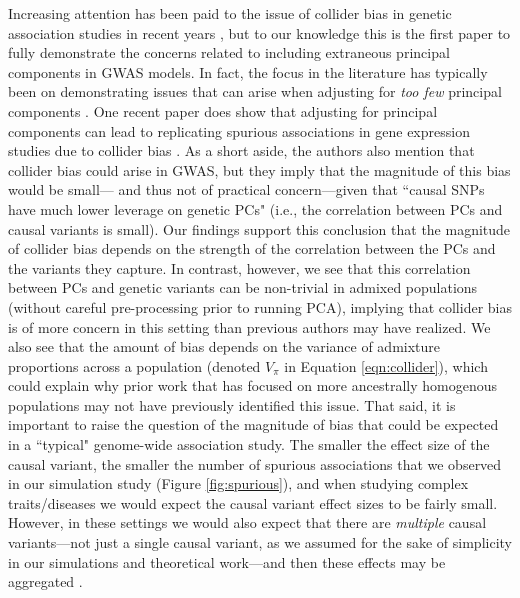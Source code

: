 \documentclass[12pt]{article}
\begin{document}
Increasing attention has been paid to the issue of collider bias in genetic association studies in recent years \citep{aschard2015, day2016, cai2022, hemani2022}, but to our knowledge this is the first paper to fully demonstrate the concerns related to including extraneous principal components in GWAS models.
In fact, the focus in the literature has typically been on demonstrating issues that can arise when adjusting for \textit{too few} principal components \citep{eigenstrat, kang2010, Yao2022}. %
One recent paper does show that adjusting for principal components can lead to replicating spurious associations in gene expression studies due to collider bias \citep{dahl2019}.
As a short aside, the authors also mention that collider bias could arise in GWAS, but they imply that the magnitude of this bias would be small--- and thus not of practical concern---given that ``causal SNPs have much lower leverage on genetic PCs" (i.e., the correlation between PCs and causal variants is small).  
Our findings support this conclusion that the magnitude of collider bias depends on the strength of the correlation between the PCs and the variants they capture.
In contrast, however, we see that this correlation between PCs and genetic variants can be non-trivial in admixed populations (without careful pre-processing prior to running PCA), implying that collider bias is of more concern in this setting than previous authors may have realized.
We also see that the amount of bias depends on the variance of admixture proportions across a population (denoted $V_\pi$ in Equation \ref{eqn:collider}), which could explain why prior work that has focused on more ancestrally homogenous populations may not have previously identified this issue.
That said, it is important to raise the question of the magnitude of bias that could be expected in a ``typical" genome-wide association study. 
The smaller the effect size of the causal variant, the smaller the number of spurious associations that we observed in our simulation study (Figure \ref{fig:spurious}), and when studying complex traits/diseases we would expect the causal variant effect sizes to be fairly small.
However, in these settings we would also expect that there are \textit{multiple} causal variants---not just a single causal variant, as we assumed for the sake of simplicity in our simulations and theoretical work---and then these effects may be aggregated \citep{di2011}. 
\end{document}
